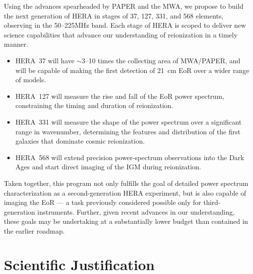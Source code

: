 \documentclass[preprint]{aastex}
\begin{document}
Using the advances spearheaded by 
PAPER and the MWA,
we propose to build the next generation of HERA in stages of 37, 127, 331, and 568 elements,
observing in the 50--225MHz band. 
Each stage of HERA is scoped to deliver new science capabilities that advance our 
understanding of reionization in a timely manner.
\begin{itemize}\setlength{\parskip}{0pt}\itemsep0pt
\item HERA~37 will have $\sim$3--10 times the collecting area of MWA/PAPER,
and will be capable of making the first detection of 21~cm EoR over
a wider range of models.
\item HERA~127 will measure the rise and fall of the EoR power
spectrum, constraining the timing and duration of reionization.
\item HERA~331 will measure the shape of the power spectrum over
a significant range in wavenumber, determining the features and distribution of
the first galaxies that dominate cosmic reionization.
\item HERA~568 will extend precision power-spectrum observations
into the Dark Ages and start direct imaging of the IGM during reionization.
\end{itemize}
{ \setlength{\parindent}{0cm}
Taken together, this program 
not only fulfills the goal of detailed power spectrum
characterization as a second-generation HERA experiment, but is also
capable of imaging the EoR --- a task previously considered possible only for
third-generation instruments.  Further, given recent advances in our understanding, these goals may be 
undertaking at a substantially lower budget than contained in the earlier roadmap.}

\vspace{-0.25in}
\section{Scientific Justification}
\label{SJsec}
\end{document}
